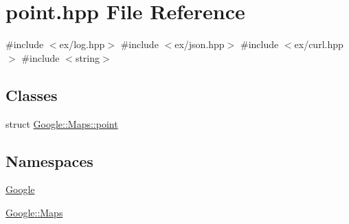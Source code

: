 \hypertarget{a00026}{}\section{point.\+hpp File Reference}
\label{a00026}
{\ttfamily \#include $<$ex/log.\+hpp$>$}\newline
{\ttfamily \#include $<$ex/json.\+hpp$>$}\newline
{\ttfamily \#include $<$ex/curl.\+hpp$>$}\newline
{\ttfamily \#include $<$string$>$}\newline
\subsection*{Classes}
\begin{DoxyCompactItemize}
\item 
struct \hyperlink{a00052}{Google\+::\+Maps\+::point}
\end{DoxyCompactItemize}
\subsection*{Namespaces}
\begin{DoxyCompactItemize}
\item 
 \hyperlink{a00032}{Google}
\item 
 \hyperlink{a00033}{Google\+::\+Maps}
\end{DoxyCompactItemize}
